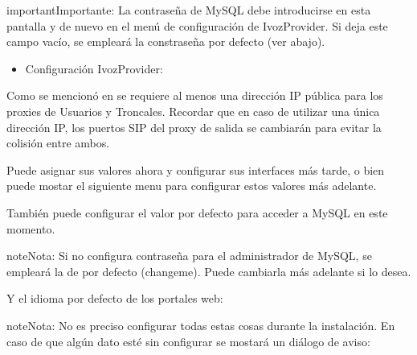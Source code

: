 \documentclass[letterpaper,10pt,spanish]{sphinxmanual}
\begin{document}
\noindent{}

\begin{notice}{important}{Importante:}
La contraseña de MySQL debe introducirse en esta pantalla y de nuevo en el menú de configuración de IvozProvider. Si deja este campo vacío, se empleará la constraseña por defecto (ver abajo).
\end{notice}
\begin{itemize}
\item {} 
Configuración IvozProvider:

\end{itemize}

\noindent{}

Como se mencionó en {\hyperref[basic_concepts/installation/requirements:minimum\string-requirements]{}} se requiere al menos una dirección IP pública para los proxies de Usuarios y Troncales. Recordar que en caso de utilizar una única dirección IP, los puertos SIP del proxy de salida se cambiarán para evitar la colisión entre ambos.

Puede asignar sus valores ahora y configurar sus interfaces más tarde, o bien puede mostar el siguiente menu para configurar estos valores más adelante.

\noindent{}

También puede configurar el valor por defecto para acceder a MySQL en este momento.

\begin{notice}{note}{Nota:}
Si no configura contraseña para el administrador de MySQL, se empleará la de por defecto (changeme). Puede cambiarla más adelante si lo desea.
\end{notice}

\noindent{}

Y el idioma por defecto de los portales web:

\noindent{}

\begin{notice}{note}{Nota:}
No es preciso configurar todas estas cosas durante la instalación. En caso de que algún dato esté sin configurar se mostará un diálogo de aviso:
\end{notice}

\noindent{}
\end{document}
